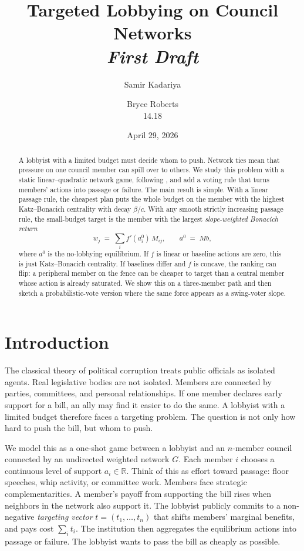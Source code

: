 \documentclass[11pt,letterpaper]{article}
\title{\bfseries Targeted Lobbying on Council Networks\\[0.4em]
{\large \emph{First Draft}}}
\author{Samir Kadariya \and Bryce Roberts\\[0.4em]
\small 14.18}
\date{April 29, 2026}
\theoremstyle{plain}
\theoremstyle{definition}
\theoremstyle{remark}
\begin{document}
\maketitle

\begin{abstract}
\noindent A lobbyist with a limited budget must decide whom to push. Network ties mean that pressure on one council member can spill over to others. We study this problem with a static linear--quadratic network game, following \citet{ggg2020}, and add a voting rule that turns members' actions into passage or failure. The main result is simple. With a linear passage rule, the cheapest plan puts the whole budget on the member with the highest Katz--Bonacich centrality with decay $\beta/c$. With any smooth strictly increasing passage rule, the small-budget target is the member with the largest \emph{slope-weighted Bonacich return}
\[
w_j \;=\; \sum_i f'(a_i^0)\, M_{ij}, \qquad a^0 \;=\; M b,
\]
where $a^0$ is the no-lobbying equilibrium. If $f$ is linear or baseline actions are zero, this is just Katz--Bonacich centrality. If baselines differ and $f$ is concave, the ranking can flip: a peripheral member on the fence can be cheaper to target than a central member whose action is already saturated. We show this on a three-member path and then sketch a probabilistic-vote version where the same force appears as a swing-voter slope.
\end{abstract}


\section{Introduction}
\label{sec:intro}

The classical theory of political corruption \citep{shleifer1993} treats public officials as isolated agents. Real legislative bodies are not isolated. Members are connected by parties, committees, and personal relationships. If one member declares early support for a bill, an ally may find it easier to do the same. A lobbyist with a limited budget therefore faces a targeting problem. The question is not only how hard to push the bill, but whom to push.

We model this as a one-shot game between a lobbyist and an $n$-member council connected by an undirected weighted network $G$. Each member $i$ chooses a continuous level of support $a_i \in \mathbb{R}$. Think of this as effort toward passage: floor speeches, whip activity, or committee work. Members face strategic complementarities. A member's payoff from supporting the bill rises when neighbors in the network also support it. The lobbyist publicly commits to a non-negative \emph{targeting vector} $t = (t_1, \ldots, t_n)$ that shifts members' marginal benefits, and pays cost $\sum_i t_i$. The institution then aggregates the equilibrium actions into passage or failure. The lobbyist wants to pass the bill as cheaply as possible.
\end{document}
